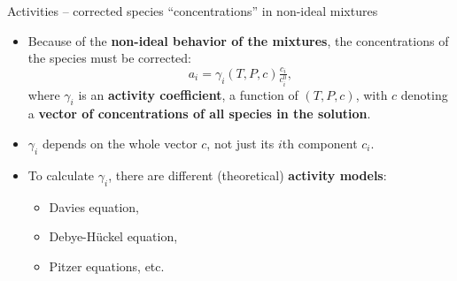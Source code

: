 \begin{frame}{Activities -- corrected species “concentrations” in non-ideal mixtures}
\begin{itemize}
\item Because of the \textbf{non-ideal behavior of the mixtures}, the concentrations
of the species must be corrected:
%
\[
a_{i}=\gamma_{i}(T,P,c) \tfrac{c_i}{c_i^0},
\]
%
where $\gamma_{i}$ is an \alert{\textbf{activity coefficient}}, a function
of $(T,P,c)$, with $c$ denoting a {\bf vector of concentrations of all species in the solution}. 
\pause
\item $\gamma_i$ depends on the whole vector $c$, not just its $i$th component $c_i$.
\pause
\item To calculate $\gamma_{i}$, there are different (theoretical) \alert{\textbf{activity models}}:
\begin{itemize}
\item Davies equation,
\item Debye-H\"uckel equation,
\item Pitzer equations, etc.
\end{itemize}
\end{itemize}
\end{frame}
%
